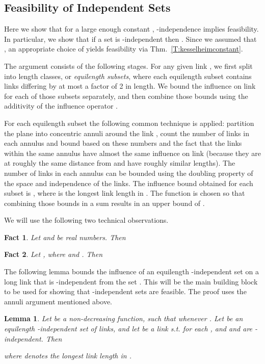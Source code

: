 \documentclass[11pt]{article}
\newcommand{\subsec}[1]{\subsection{#1}}
\newtheorem{lemma}{Lemma}
\newtheorem{fact}{Fact}
\begin{document}
\subsec{Feasibility of Independent Sets}
Here we show that for a large enough constant , -independence implies feasibility. In particular, we show that if a set  is -independent then .
Since we assumed that , an appropriate choice of  yields feasibility via Thm.\ \ref{T:kesselheimconstant}.

The argument consists of the following stages. For any given link , we first split  into length classes, or \emph{equilength subsets}, where each equilength subset contains links differing by at most a factor of 2 in length. We bound the influence on link  for each of those subsets separately, and then combine those bounds using the additivity of the influence operator . 

For each equilength subset  the following common technique is applied: partition the plane into concentric annuli around the link , count the number of links in each annulus and bound  based on these numbers and the fact that the links within the same annulus have almost the same influence on link  (because they are at roughly the same distance from  and have roughly similar lengths). The number of links in each annulus can be bounded using the doubling property of the space and independence of the links. The influence bound obtained for each subset  is , where  is the longest link length in . The function  is chosen so that combining those bounds in a sum results in an upper bound of .


We will use the following two technical observations.
 \begin{fact}\label{L:convex}
 Let  and  be real numbers. Then
 
 \end{fact}

\begin{fact}\label{L:integral}
Let , where  and . Then 

\end{fact}


The following lemma bounds the influence of an equilength -independent set  on a long link  that is -independent from the set . This will be the main building block to be used for showing that -independent sets are feasible. The proof uses the annuli argument mentioned above.


\begin{lemma}\label{L:garbage}
 Let  be a non-decreasing function, such that  whenever . Let  be an equilength  -independent set of links, and let  be a link s.t. for each ,  and  and  are -independent. 
Then
 
where  denotes the longest link length in .
 \end{lemma}
\end{document}
